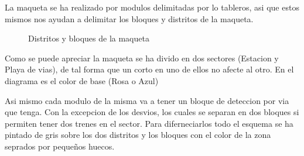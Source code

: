 La maqueta se ha realizado por modulos delimitadas por lo tableros, asi que estos mismos nos ayudan a delimitar los bloques y distritos de la maqueta.


\begin{figure}[H]
    \centering
{}

    \caption{Distritos y bloques de la maqueta}
    \label{fig:particionSectores}
\end{figure}

Como se puede apreciar la maqueta se ha divido en dos sectores (Estacion y Playa de vias),
de tal forma que un corto en uno de ellos no afecte al otro. En el diagrama es el color de base (Rosa o Azul)


Asi mismo cada modulo de la misma va a tener un bloque de deteccion por via que tenga. Con la excepcion de los desvios, los cuales se separan en dos bloques si permiten tener dos trenes en el sector. Para diferneciarlos todo el esquema se ha pintado de gris sobre los dos distritos y los bloques con el color de la zona seprados por pequeños huecos.